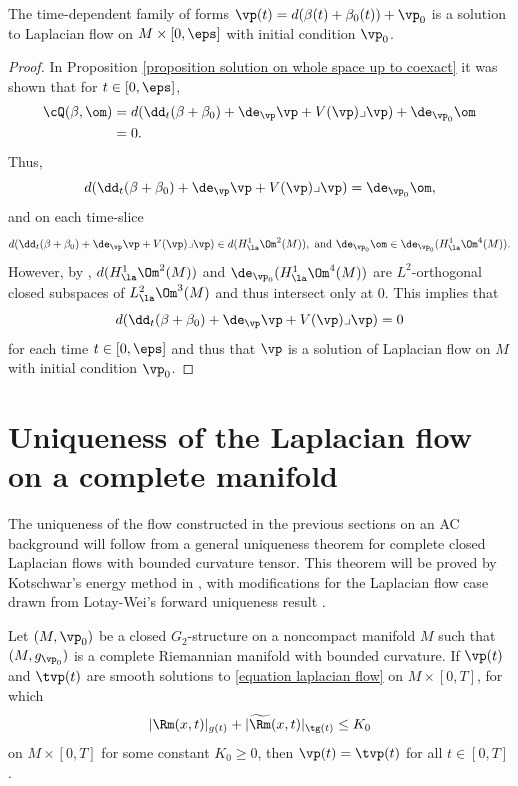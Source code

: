 \documentclass[hidelinks, 12pt, oneside, reqno]{amsart}
\begin{document}
\begin{thm}\label{theorem solution is exact solution}
    The time-dependent family of forms $\vp(t) = d(\beta(t) + \beta_0(t)) + \vp_0$ is a solution to Laplacian flow on $M \times [0,\eps]$ with initial condition $\vp_0$.
\end{thm}

\begin{proof}
    In Proposition \ref{proposition solution on whole space up to coexact} it was shown that for $t \in [0,\eps]$,
    \begin{align*}
        \cQ(\beta,\om) &= d(\dd_t (\beta + \beta_0) + \de_\vp \vp  + V(\vp) \lrcorner \vp) + \de_{\vp_0} \om \\
        &= 0.
    \end{align*}
    Thus, 
    \[
    d(\dd_t (\beta + \beta_0) + \de_\vp \vp  + V(\vp) \lrcorner \vp) = \de_{\vp_0} \om,
    \]
    and on each time-slice
    \[
    d(\dd_t (\beta + \beta_0) + \de_\vp \vp  + V(\vp) \lrcorner \vp) \in d(H^1_{\la}\Om^2(M)), \text{ and } \de_{\vp_0} \om \in \de_{\vp_0}(H^1_{\la}\Om^4(M)).
    \]
    However, by \cite[Proposition 4.31]{KarigiannisLotay}, $d(H^1_{\la}\Om^2(M))$ and $\de_{\vp_0}(H^1_{\la}\Om^4(M))$ are $L^2$-orthogonal closed subspaces of $L^2_\la \Om^3(M)$ and thus intersect only at 0. This implies that
    \[
    d(\dd_t (\beta + \beta_0) + \de_\vp \vp  + V(\vp) \lrcorner \vp) = 0
    \]
    for each time $t \in [0,\eps]$ and thus that $\vp$ is a solution of Laplacian flow on $M$ with initial condition $\vp_0$. 
\end{proof}


\section{Uniqueness of the Laplacian flow on a complete manifold}\label{section uniqueness}

The uniqueness of the flow constructed in the previous sections on an AC background will follow from a general uniqueness theorem for complete closed Laplacian flows with bounded curvature tensor. This theorem will be proved by Kotschwar's energy method in \cite{kotschwarEnergy}, with modifications for the Laplacian flow case drawn from Lotay-Wei's forward uniqueness result \cite[\S 6]{LotayWeiLaplacianFlow}.  
\begin{thm}\label{theorem uniqueness complete bdd curvature}
    Let $(M,\vp_0)$ be a closed $G_2$-structure on a noncompact manifold $M$ such that $(M,g_{\vp_0})$ is a complete Riemannian manifold with bounded curvature. If $\vp(t)$ and $\tvp(t)$ are smooth solutions to \eqref{equation laplacian flow} on $M \times [0,T]$, for which
    \[
    |\Rm (x,t)|_{g(t)} + |\widetilde \Rm (x,t)|_{\tg(t)} \le K_0
    \]
    on $M \times [0,T]$ for some constant $K_0 \ge 0$, then $\vp(t) = \tvp(t)$ for all $t \in [0,T]$. 
\end{thm}
\end{document}
